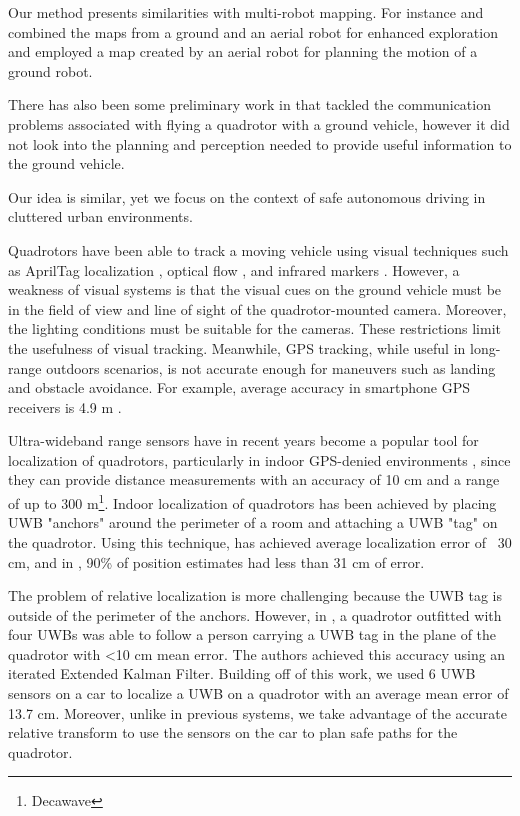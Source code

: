 Our method presents similarities with multi-robot mapping. For instance \cite{Michael:2012gl} and \cite{Forster:2013kn} combined the maps from a ground and an aerial robot for enhanced exploration and \cite{Delmerico:2017vq} employed a map created by an aerial robot for planning the motion of a ground robot.

There has also been some preliminary work in \cite{nasser2015fleye} that tackled the communication problems associated with flying a quadrotor with a ground vehicle, however it did not look into the planning and perception needed to provide useful information to the ground vehicle.

Our idea is similar, yet we focus on the context of safe autonomous driving in cluttered urban environments.

Quadrotors have been able to track a moving vehicle using visual techniques
such as AprilTag localization \cite{borowczyk2016autonomous}, optical flow \cite{herisse2012landing},
and infrared markers \cite{wenzel2011automatic}. However, a weakness of visual systems
is that the visual cues on the ground vehicle must be in the field of view and line
of sight of the quadrotor-mounted camera. Moreover, the lighting conditions must be suitable
for the cameras. These restrictions limit the usefulness of visual tracking. Meanwhile,
GPS tracking, while useful in long-range outdoors scenarios, is not accurate enough for 
maneuvers such as landing and obstacle avoidance. For example, average accuracy in
smartphone GPS receivers is 4.9 m \cite{gpsaccuracy}.

Ultra-wideband range sensors have in recent years become a popular tool for
localization of quadrotors, particularly in indoor GPS-denied environments \cite{prorok2014}, since they can
provide distance measurements with an accuracy of 10 cm and a range of
up to 300 m\footnote{Decawave}. Indoor localization of quadrotors has been
achieved by placing UWB "anchors" around the perimeter of a room and attaching
a UWB "tag" on the quadrotor.  Using this technique, \cite{mueller2015fusing}
has achieved average localization error of ~30 cm, and in
\cite{kempke2016harmonium}, 90\% of position estimates had less than 31 cm of error.

The problem of relative localization is more challenging because the UWB tag is outside of
the perimeter of the anchors. However, in \cite{tobiuwb}, a quadrotor
outfitted with four UWBs was able to follow a person carrying a UWB tag
in the plane of the quadrotor
with <10 cm mean error. The authors achieved this accuracy using an
iterated Extended Kalman Filter. Building off of this work, we used
6 UWB sensors on a car to localize a UWB on a quadrotor with an
average mean error of 13.7 cm. Moreover, unlike in previous systems,
we take advantage of the accurate relative transform to use the sensors
on the car to plan safe paths for the quadrotor.

